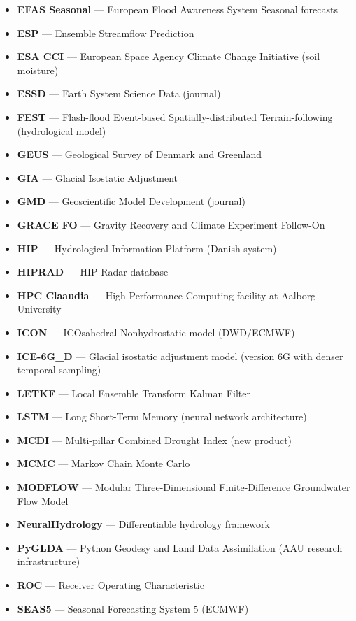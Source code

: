 \begin{itemize}
    \item \textbf{EFAS Seasonal} --- European Flood Awareness System Seasonal forecasts
    \item \textbf{ESP} --- Ensemble Streamflow Prediction
    \item \textbf{ESA CCI} --- European Space Agency Climate Change Initiative (soil moisture)
    \item \textbf{ESSD} --- Earth System Science Data (journal)
    \item \textbf{FEST} --- Flash-flood Event-based Spatially-distributed Terrain-following (hydrological model)
    \item \textbf{GEUS} --- Geological Survey of Denmark and Greenland
    \item \textbf{GIA} --- Glacial Isostatic Adjustment
    \item \textbf{GMD} --- Geoscientific Model Development (journal)
    \item \textbf{GRACE FO} --- Gravity Recovery and Climate Experiment Follow-On
    \item \textbf{HIP} --- Hydrological Information Platform (Danish system)
    \item \textbf{HIPRAD} --- HIP Radar database
    \item \textbf{HPC Claaudia} --- High-Performance Computing facility at Aalborg University
    \item \textbf{ICON} --- ICOsahedral Nonhydrostatic model (DWD/ECMWF)
    \item \textbf{ICE-6G\_D} --- Glacial isostatic adjustment model (version 6G with denser temporal sampling)
    \item \textbf{LETKF} --- Local Ensemble Transform Kalman Filter
    \item \textbf{LSTM} --- Long Short-Term Memory (neural network architecture)
    \item \textbf{MCDI} --- Multi-pillar Combined Drought Index (new product)
    \item \textbf{MCMC} --- Markov Chain Monte Carlo
    \item \textbf{MODFLOW} --- Modular Three-Dimensional Finite-Difference Groundwater Flow Model
    \item \textbf{NeuralHydrology} --- Differentiable hydrology framework
    \item \textbf{PyGLDA} --- Python Geodesy and Land Data Assimilation (AAU research infrastructure)
    \item \textbf{ROC} --- Receiver Operating Characteristic
    \item \textbf{SEAS5} --- Seasonal Forecasting System 5 (ECMWF)

\end{itemize}
